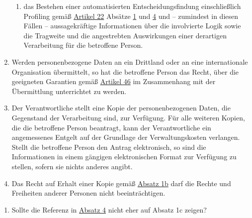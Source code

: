 \begin{enumerate}
\begin{enumerate}
    \item das Bestehen einer automatisierten Entscheidungsfindung einschließlich Profiling gemäß \hyperref[ch:22]
     {Artikel 22} Absätze \hyperref[itm:22-1]{1} und \hyperref[itm:22-4]{4} und -- zumindest in diesen Fällen --
     aussagekräftige Informationen über die involvierte Logik sowie die Tragweite und die angestrebten Auswirkungen
     einer derartigen Verarbeitung für die betroffene Person.
    \label{itm:15-1a}

  \end{enumerate}

  \item Werden personenbezogene Daten an ein Drittland oder an eine internationale Organisation übermittelt, so hat die
   betroffene Person das Recht, über die geeigneten Garantien gemäß \hyperref[ch:46]{Artikel 46} im Zusammenhang mit der
   Übermittlung unterrichtet zu werden.
  \label{itm:15-2}

  \item Der Verantwortliche stellt eine Kopie der personenbezogenen Daten, die Gegenstand der Verarbeitung sind, zur
   Verfügung. Für alle weiteren Kopien, die die betroffene Person beantragt, kann der Verantwortliche ein angemessenes
   Entgelt auf der Grundlage der Verwaltungskosten verlangen. Stellt die betroffene Person den Antrag elektronisch, so
   sind die Informationen in einem gängigen elektronischen Format zur Verfügung zu stellen, sofern sie nichts anderes
   angibt.
  \label{itm:15-3}

  \item Das Recht auf Erhalt einer Kopie gemäß \hyperref[itm:15-1b]{Absatz 1b} darf die Rechte und Freiheiten anderer
  Personen nicht beeinträchtigen.
  \label{itm:15-4}

\end{enumerate}


\begin{enumerate}

  \item Sollte die Referenz in \hyperref[itm:15-4]{Absatz 4} nicht eher auf Absatz 1c zeigen?

\end{enumerate}

